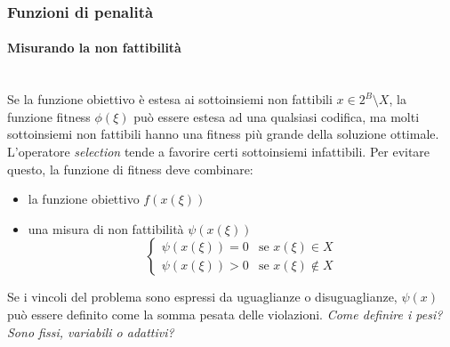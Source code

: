 \documentclass{article}
\begin{document}
\subsubsection{Funzioni di penalità}
\paragraph{Misurando la non fattibilità}\mbox{}\\
Se la funzione obiettivo è estesa ai sottoinsiemi non fattibili $x\in 2^B\setminus X$,
la funzione fitness $\phi(\xi)$ può essere estesa ad una qualsiasi codifica, ma
molti sottoinsiemi non fattibili hanno una fitness più grande della soluzione ottimale.
L'operatore \textit{selection} tende a favorire certi sottoinsiemi infattibili. Per
evitare questo, la funzione di fitness deve combinare:
\begin{itemize}
    \item la funzione obiettivo $f(x(\xi))$
    \item una misura di non fattibilità $\psi(x(\xi))$
    \[
        \begin{cases}
            \psi(x(\xi))=0 & \text{se }x(\xi)\in X\\
            \psi(x(\xi))>0 & \text{se }x(\xi)\notin X
        \end{cases}
    \]
\end{itemize}
Se i vincoli del problema sono espressi da uguaglianze o disuguaglianze, $\psi(x)$ può
essere definito come la somma pesata delle violazioni.
\textit{Come definire i pesi?}\textit{Sono fissi, variabili o adattivi?}
\end{document}
